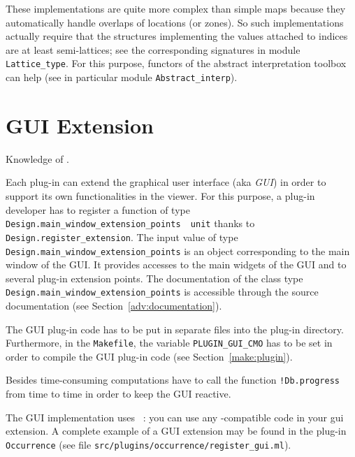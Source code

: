 These implementations are quite more complex than simple maps because they
automatically handle overlaps of locations (or zones). So such implementations
actually require that the structures implementing the values attached to indices
are at least semi-lattices; see the corresponding signatures
in module \texttt{Lattice\_type}. For
this purpose, functors of the abstract interpretation toolbox%
 can help (see in particular module
\texttt{Abstract\_interp}).


\section{GUI Extension}\label{adv:gui}

\begin{prereq}
  Knowledge of \lablgtk.
\end{prereq}

Each plug-in can extend the \framac graphical user interface (aka \emph{GUI})
in order to support its own functionalities in the \framac viewer. For this
purpose, a plug-in developer has to register a function of type
\texttt{Design.main\_window\_extension\_points \fl~unit} thanks to
\texttt{Design.register\_extension}. The
input value of type \texttt{Design.main\_window\_extension\_points} is an
object corresponding to the main window of the \framac GUI. It provides
accesses to the main widgets of the \framac GUI and to several plug-in extension
points. The documentation of the class type
\texttt{Design.main\_window\_extension\_points}%
 is accessible through the
source documentation (see Section~\ref{adv:documentation}).

The GUI plug-in code has to be put in separate files into the plug-in
directory. Furthermore, in the
\texttt{Makefile}, the variable
\texttt{PLUGIN\_GUI\_CMO} has to be set in order to
compile the GUI plug-in code (see Section~\ref{make:plugin}).

Besides time-consuming computations have to call the function
\texttt{!Db.progress} from time to time in order to keep the GUI reactive.

The GUI implementation uses
\lablgtk~\cite{lablgtk}: you can use any \lablgtk-compatible
code in your gui extension. A complete example of a GUI extension may be found in
the plug-in \texttt{Occurrence} (see file
\texttt{src/plugins/occurrence/register\_gui.ml}).

